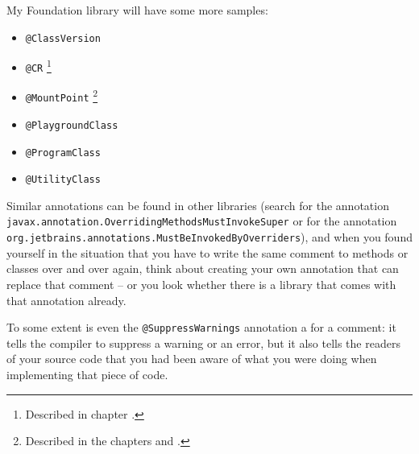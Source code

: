 My Foundation library will have some more samples:
\begin{itemize}[nosep]
	\item{\lstinline|@ClassVersion| \autocite{TQUADRAT_ORG_FOUNDATION_CLASSVERSION}}
	
	\item{\lstinline|@CR| \autocite{TQUADRAT_ORG_FOUNDATION_CR}\footnote{Described in chapter .}}
	
	\item{\lstinline|@MountPoint| \autocite{TQUADRAT_ORG_FOUNDATION_MOUNTPOINT}\footnote{Described in the chapters  and .}}
	
	\item{\lstinline|@PlaygroundClass| \autocite{TQUADRAT_ORG_FOUNDATION_PLAYGROUNDCLASS}}
	
	\item{\lstinline|@ProgramClass| \autocite{TQUADRAT_ORG_FOUNDATION_PROGRAMCLASS}}
	
	\item{\lstinline|@UtilityClass| \autocite{TQUADRAT_ORG_FOUNDATION_UTILITYCLASS}}
\end{itemize}

Similar annotations can be found in other libraries (search for the annotation \lstinline|javax.annotation.OverridingMethodsMustInvokeSuper| or for the annotation \lstinline|org.jetbrains.annotations.MustBeInvokedByOverriders|), and when you found yourself in the situation that you have to write the same comment to methods or classes over and over again, think about creating your own annotation that can replace that comment – or you look whether there is a library that comes with that annotation already.

To some extent is even the \lstinline|@SuppressWarnings| \autocite{ORACLE_DOC_SUPPRESSWARNINGS_ANNOTATION} annotation a  for a comment: it tells the compiler to suppress a warning or an error, but it also tells the readers of your source code that you had been aware of what you were doing when implementing that  piece of code.

